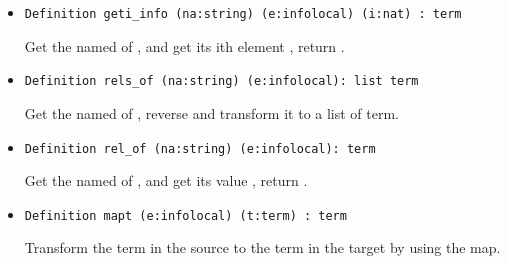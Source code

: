 \documentclass[a4paper,UKenglish,cleveref, autoref, thm-restate]{lipics-v2021}
\begin{document}
\begin{itemize}
\item
\begin{lstlisting}[language = {Coq}, basicstyle = \small]
Definition geti_info (na:string) (e:infolocal) (i:nat) : term
\end{lstlisting}
Get the  named  of , and get its ith element , return .


\item
\begin{lstlisting}[language = {Coq}, basicstyle = \small]
Definition rels_of (na:string) (e:infolocal): list term
\end{lstlisting}
Get the  named  of , reverse and transform it to a 
list of  term.


\item
\begin{lstlisting}[language = {Coq}, basicstyle = \small]
Definition rel_of (na:string) (e:infolocal): term
\end{lstlisting}
Get the  named  of , and get its value , return .

\item
\begin{lstlisting}[language = {Coq}, basicstyle = \small]
Definition mapt (e:infolocal) (t:term) : term
\end{lstlisting}
Transform the term in the source to the term in the target by using the  map.








\end{itemize}
\end{document}
